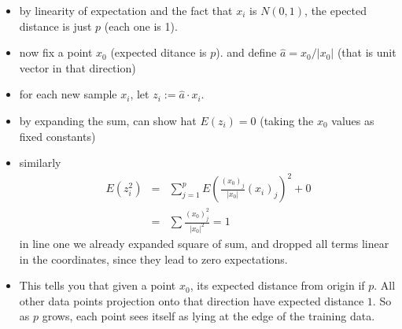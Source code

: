 \documentclass[a4paper]{report}
\newcommand{\<}{\textless}
\renewcommand{\>}{\textgreater}
\begin{document}
\begin{itemize}
\begin{itemize}
      \item by linearity of expectation and the fact that $x_i$ is $N(0,1)$, the epected distance is just $p$ (each one is 1).
      \item now fix a point $x_0$ (expected ditance is $p$). and define $\hat{a} = x_0/|x_0|$ (that is unit vector in that direction)
      \item for each new sample $x_i$, let $z_i:= \hat{a} \cdot x_i$.
      \item by expanding the sum, can show hat $E(z_i) = 0$ (taking the $x_0$ values as fixed constants)
      \item similarly
	\begin{eqnarray}
	  E(z_i^2) &=&\sum_{j=1}^p E\left( \frac{(x_0)_j}{|x_0|} (x_i)_j\right)^2 + 0 \\
	   &=& \sum\frac{(x_0)_j^2}{|x_0|^2} = 1
	\end{eqnarray}
	in line one we already expanded square of sum, and dropped all terms linear in the coordinates, since they lead to zero expectations.
      \item This tells you that given a point $x_0$, its expected distance from origin if $p$. All other data points projection onto that direction have expected distance $1$. So as $p$ grows, each point sees itself as lying at the edge of the training data. 
    \end{itemize}
\end{itemize}
\end{document}
